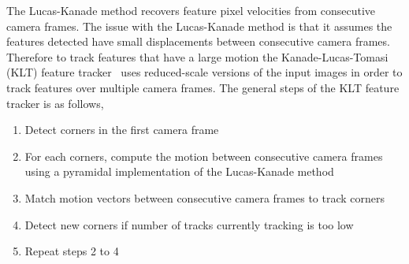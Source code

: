 The Lucas-Kanade method recovers feature pixel velocities from consecutive
camera frames. The issue with the Lucas-Kanade method is that it assumes the
features detected have small displacements between consecutive camera frames.
Therefore to track features that have a large motion the Kanade-Lucas-Tomasi
(KLT) feature tracker~\cite{Lucas1981} uses reduced-scale versions of the input
images in order to track features over multiple camera frames. The general
steps of the KLT feature tracker is as follows,
%
\begin{enumerate}
	\item{Detect corners in the first camera frame}
	\item{For each corners, compute the motion between consecutive camera frames
			  using a pyramidal implementation of the Lucas-Kanade method}
	\item{Match motion vectors between consecutive camera frames to track corners}
	\item{Detect new corners if number of tracks currently tracking is too low}
	\item{Repeat steps 2 to 4}
\end{enumerate}

